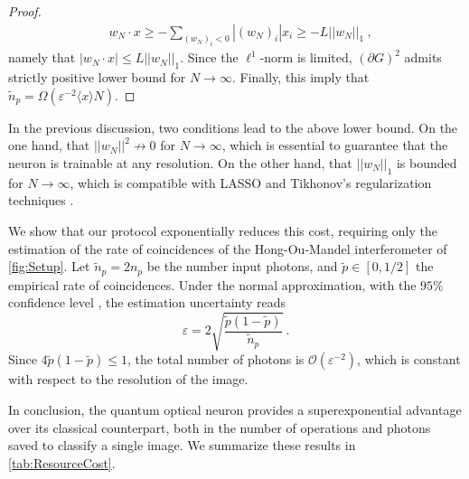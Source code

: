\documentclass[reprint,
superscriptaddress,
nofootinbib,
aps,
pra,
showkeys
]{revtex4-2}
\renewcommand{\O}{\mathcal{O}}
\begin{document}
\begin{widetext}
\begin{proof}
\begin{align}
	&w_{N}\cdot x \geq - \sum_{(w_{N})_i < 0}|(w_{N})_i| x_i \geq - L||w_N||_1 \ ,
\end{align}
namely that $|w_{N}\cdot x| \leq L ||w_N||_1$. Since the $\ell^1$-norm is limited, $(\partial G)^2$ admits strictly positive lower bound for $N \to \infty$. Finally, this imply that $\tilde{n}_{p} = \Omega\left(\varepsilon^{-2}\langle x \rangle N\right)$.
\end{proof}
In the previous discussion, two conditions lead to the above lower bound. On the one hand, that $||w_N||^2 \not\to 0$ for $N \to \infty$, which is essential to guarantee that the neuron is trainable at any resolution. On the other hand, that $||w_N||_1$ is bounded for $N \to \infty$, which is compatible with LASSO and Tikhonov's regularization techniques \citep{art:Santosa,art:Tikhonov}.

We show that our protocol exponentially reduces this cost, requiring only the estimation of the rate of coincidences of the Hong-Ou-Mandel interferometer of \cref{fig:Setup}. Let $\tilde{n}_p = 2n_p$ be the number input photons, and $\tilde{p} \in [0,1/2]$ the empirical rate of coincidences. Under the normal approximation, with the $95\%$ confidence level \citep{book:Rotondi}, the estimation uncertainty reads
\begin{equation}
	\varepsilon = 2 \sqrt{\frac{\tilde{p}(1-\tilde{p})}{\tilde{n}_p}} \ .
\end{equation}
Since $4 \tilde{p}(1-\tilde{p}) \leq 1$, the total number of photons is $\O(\varepsilon^{-2})$, which is constant with respect to the resolution of the image.

In conclusion, the quantum optical neuron provides a superexponential advantage over its classical counterpart, both in the number of operations and photons saved to classify a single image. We summarize these results in \cref{tab:ResourceCost}.
\end{widetext}


\end{document}
